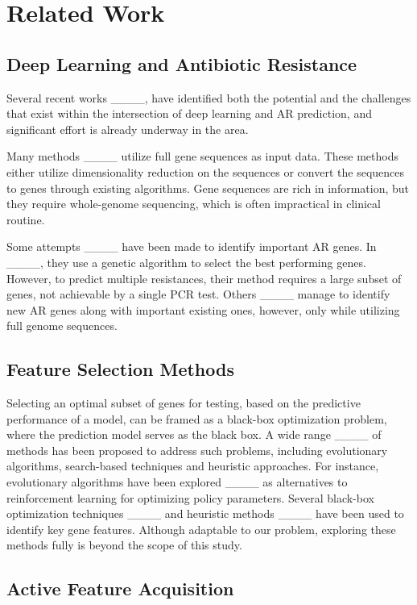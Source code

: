 \section{Related Work}
\subsection{Deep Learning and Antibiotic Resistance}

Several recent works ____, have identified both the potential and the challenges that exist within the intersection of deep learning and AR prediction, and significant effort is already underway in the area. 

Many methods ____ utilize full gene sequences as input data. These methods either utilize dimensionality reduction on the sequences or convert the sequences to genes through existing algorithms. Gene sequences are rich in information, but they require whole-genome sequencing, which is often impractical in clinical routine.

Some attempts ____ have been made to identify important AR genes. In  ____, they use a genetic algorithm to select the best performing genes. However, to predict multiple resistances, their method requires a large subset of genes, not achievable by a single PCR test. Others ____ manage to identify new AR genes along with important existing ones, however, only while utilizing full genome sequences.

\subsection{Feature Selection Methods}

Selecting an optimal subset of genes for testing, based on the predictive performance of a model, can be framed as a black-box optimization problem, where the prediction model serves as the black box. A wide range ____ of methods has been proposed to address such problems, including evolutionary algorithms, search-based techniques and heuristic approaches. For instance, evolutionary algorithms have been explored ____ as alternatives to reinforcement learning for optimizing policy parameters. Several black-box optimization techniques ____ and heuristic methods ____ have been used to identify key gene features. Although adaptable to our problem, exploring these methods fully is beyond the scope of this study.


\subsection{Active Feature Acquisition}

